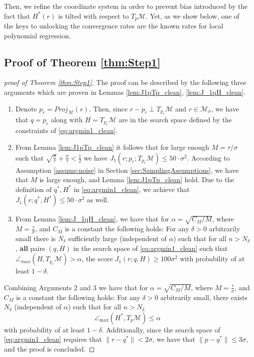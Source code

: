 \documentclass[12pt]{article}
\theoremstyle{remark}
\newcommand{\MM}{\mathcal{M}}
\newcommand{\sM}{{M}}
\begin{document}
Then, we refine the coordinate system in order to prevent bias introduced by the fact that $H^*(r)$ is tilted with respect to $T_{p}\MM$.
Yet, as we show below, one of the keys to unlocking the convergence rates are the known rates for local polynomial regression.



\subsection{Proof of Theorem \ref{thm:Step1}}
\label{sec:Step1Analysis}
\begin{proof}[proof of Theorem \ref{thm:Step1}]
	The proof can be described by the following three arguments which are proven in Lemmas \ref{lem:J1pTp_clean}, \ref{lem:J_1qH_clean}.
	\begin{enumerate}
		\item[Arg. 1:]\label{outline:Step1_1_clean}
		Denote $p_r = Proj_\MM(r)$.
		Then, since $r - p_r\perp T_{p_r}\MM $ and $r\in\MM_\sigma$, we have that $q = p_r$ along with $H= T_{p_r}\MM$ are in the search space defined by the constraints of \eqref{eq:argmin1_clean}.
		
		\item[Arg. 2:]\label{outline:Step1_2_clean} 
		From Lemma \ref{lem:J1pTp_clean} it follows that for large enough $M = \tau/\sigma$ such that $ \sqrt{\frac{\sigma}{\tau}}  + \frac{\sigma}{\tau} < \frac{1}{2} $ we have $J_1(r; p_r; T_{p_r}\MM) \leq 50\cdot \sigma^2$. 
		According to Assumption \ref{assume:noise} in Section \ref{sec:SamplingAssumptions}, we have that $M$ is large enough, and Lemma \ref{lem:J1pTp_clean} hold.
		Due to the definition of $q^*, H^*$ in \eqref{eq:argmin1_clean}, we achieve that $J_1(r; q^*, H^*) \leq 50 \cdot \sigma^2$ as well.
		
		\item[Arg. 3:]\label{outline:Step1_3_clean} From Lemma \ref{lem:J_1qH_clean}, we have that  
		for $\alpha = \sqrt{C_\sM/M}$, where $M = \frac{\tau}{\sigma}$, and $C_\sM$ is a constant
		the following holds:
		For any $\delta >0$ arbitrarily small there is $ N_{\delta} $ sufficiently large (independent of $\alpha$) such that for all $ n>N_{\delta} $, \textbf{all} pairs $(q, H)$ in the search space of \eqref{eq:argmin1_clean} such that $\angle_{max}(H,T_{p_r}\MM) > \alpha$, the score $J_1(r; q, H) \geq 100 \sigma^2 $ with probability of at least $1 - \delta$.
	\end{enumerate}
	Combining Arguments 2 and 3 we have that 
	for $\alpha = \sqrt{C_\sM/M}$, where $M = \frac{\tau}{\sigma}$, and $C_\sM$ is a constant
	the following holds:
	For any $\delta>0$ arbitrarily small, there exists $ N_{\delta} $ (independent of $\alpha$) such that for all $ n > N_{\delta} $ 
	\[\angle_{\max}(H^*, T_p\MM)\leq \alpha\]
	with probability of at least $ 1 - \delta $. Additionally, since the search space of \eqref{eq:argmin1_clean} requires that $\|r-q^*\| <2\sigma$, we have that $\|p-q^*\|\leq 3\sigma$, and the proof is concluded.
\end{proof}
\end{document}
